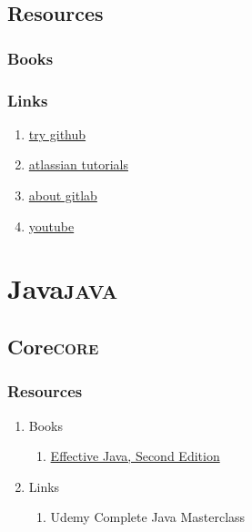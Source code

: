 \documentclass[11pt]{article}
\begin{document}
\subsection{Resources}
\label{sec:org349c208}
\subsubsection{Books}
\label{sec:orgfe29544}
\subsubsection{Links}
\label{sec:org58e0d6b}
\begin{enumerate}
\item \href{https://try.github.io/}{try github}
\label{sec:orgf33d95c}
\item \href{https://www.atlassian.com/git/tutorials/}{atlassian tutorials}
\label{sec:orgddfc11f}
\item \href{https://about.gitlab.com/}{about gitlab}
\label{sec:org2bd5b04}
\item \href{https://www.youtube.com/watch?v=mql6bmoysiq}{youtube}
\label{sec:orgec774a4}
\end{enumerate}
\section{Java\hfill{}\textsc{java}}
\label{sec:orga1bece1}
\subsection{Core\hfill{}\textsc{core}}
\label{sec:orgf7ae299}
\subsubsection{Resources}
\label{sec:org8c2eac1}
\begin{enumerate}
\item Books
\label{sec:org1e90b06}
\begin{enumerate}
\item \href{../notes/pdf/effectivejava2ndedition.pdf::1}{Effective Java, Second Edition}
\label{sec:orgcb401c1}
\end{enumerate}
\item Links
\label{sec:orgb11ba97}
\begin{enumerate}
\item Udemy Complete Java Masterclass
\label{sec:org56b5068}
\end{enumerate}
\end{enumerate}
\end{document}
